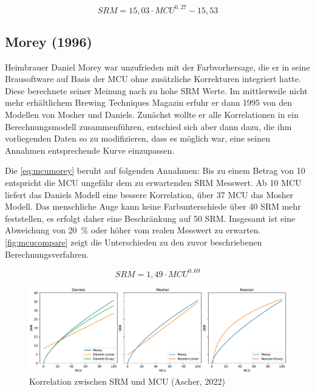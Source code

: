 \documentclass[a4paper,parskip=half]{scrartcl}
\newcommand{\MCUL}{\mathit{MCU}}
\newcommand{\SRM}{\mathit{SRM}}
\begin{document}
\begin{equation}
\SRM = 15,03 \cdot \MCUL^{0,27} - 15,53
\label{eq:mcunoonandruey}
\end{equation}

\subsection*{Morey (1996)}

Heimbrauer Daniel Morey war unzufrieden mit der Farbvorhersage, die er in seine Brausoftware auf Basis der MCU ohne zusätzliche Korrekturen integriert hatte. Diese berechnete seiner Meinung nach zu hohe SRM Werte. Im mittlerweile nicht mehr erhältlichem Brewing Techniques Magazin erfuhr er dann 1995 von den Modellen von  Mosher und Daniels. Zunächst wollte er alle Korrelationen in ein Berechnungsmodell zusammenführen, entschied sich aber dann dazu, die ihm vorliegenden Daten so zu modifizieren, dass es möglich war, eine seinen Annahmen entsprechende Kurve einzupassen. \parencite{Smith2010}

Die \autoref{eq:mcumorey} beruht auf folgenden Annahmen: Bis zu einem Betrag von 10 entspricht die MCU ungefähr dem zu erwartenden SRM Messwert. Ab 10 MCU liefert das Daniels Modell eine bessere Korrelation, über 37 MCU das Mosher Modell. Das menschliche Auge kann keine Farbunterschiede über 40 SRM mehr feststellen, es erfolgt daher eine Beschränkung auf 50 SRM. Insgesamt ist eine Abweichung von 20~\% oder höher vom realen Messwert zu erwarten. \autoref{fig:mcucompare} zeigt die Unterschieden zu den zuvor beschriebenen Berechnungsverfahren. \parencite{Morey2004}

\begin{equation}
\SRM = 1,49 \cdot \MCUL^{0,69}
\label{eq:mcumorey}
\end{equation}

\begin{figure}[h]
\centering
\includegraphics[width=14cm]{graph_srm.pdf}
\caption{Korrelation zwischen SRM und MCU (Ascher, 2022)}
\label{fig:mcucompare}
\end{figure}
\end{document}
